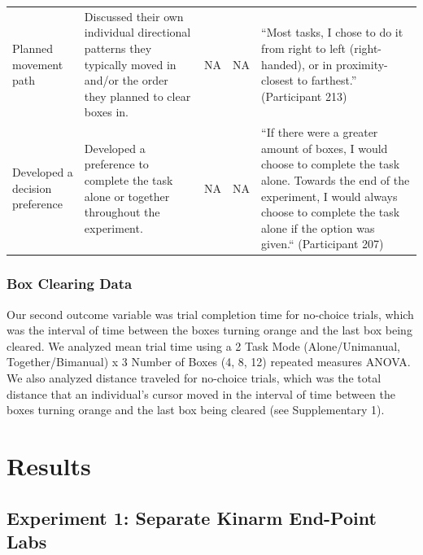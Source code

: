 \documentclass[
  11pt,
  letterpaper,
]{article}
\begin{document}
\begin{landscape}
\begin{longtable}[l]{>{\raggedright\arraybackslash}p{3.75cm}>{\raggedright\arraybackslash}p{5cm}>{\raggedright\arraybackslash}p{3cm}>{\raggedright\arraybackslash}p{3cm}>{\raggedright\arraybackslash}p{6cm}}
\addlinespace
Planned movement path & Discussed their own individual directional patterns they typically moved in and/or the order they planned to clear boxes in. & NA & NA & “Most tasks, I chose to do it from right to left (right-handed), or in proximity- closest to farthest.” (Participant 213)\\
\addlinespace
Developed a decision preference & Developed a preference to complete the task alone or together throughout the experiment. & NA & NA & “If there were a greater amount of boxes, I would choose to complete the task alone. Towards the end of the experiment, I would always choose to complete the task alone if the option was given.“ (Participant 207)\\
\bottomrule

\end{longtable}

\endgroup{}
\end{landscape}

\endgroup
\clearpage

\subsubsection{Box Clearing Data}\label{box-clearing-data}

Our second outcome variable was trial completion time for no-choice
trials, which was the interval of time between the boxes turning orange
and the last box being cleared. We analyzed mean trial time using a 2
Task Mode (Alone/Unimanual, Together/Bimanual) x 3 Number of Boxes (4,
8, 12) repeated measures ANOVA. We also analyzed distance traveled for
no-choice trials, which was the total distance that an individual's
cursor moved in the interval of time between the boxes turning orange
and the last box being cleared (see Supplementary 1).

\section{Results}\label{results}

\subsection{Experiment 1: Separate Kinarm End-Point
Labs}\label{experiment-1-separate-kinarm-end-point-labs-1}
\end{document}
